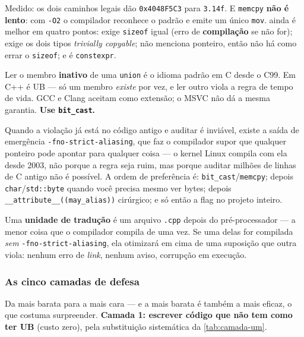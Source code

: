 Medido: os dois caminhos legais dão \texttt{0x4048F5C3} para \texttt{3.14f}. E
\texttt{memcpy} \textbf{não é lento}: com \texttt{-O2} o compilador reconhece o
padrão e emite um único \texttt{mov}.  ainda é melhor em
quatro pontos: exige \texttt{sizeof} igual (erro de \textbf{compilação} se não
for); exige os dois tipos \emph{trivially copyable}; não menciona ponteiro, então
não há como errar o \texttt{sizeof}; e é \texttt{constexpr}.

\begin{armadilha}
Ler o membro \textbf{inativo} de uma \texttt{union} é o idioma padrão em C desde o
C99. Em C++ é UB --- só um membro \emph{existe} por vez, e ler outro viola a regra
de tempo de vida. GCC e Clang aceitam como extensão; o MSVC não dá a mesma
garantia. \textbf{Use \texttt{bit\_cast}.}
\end{armadilha}

Quando a violação já está no código antigo e auditar é inviável, existe a saída de
emergência \texttt{-fno-strict-aliasing}, que faz o compilador supor que qualquer
ponteiro pode apontar para qualquer coisa --- o kernel Linux compila com ela desde
2003, não porque a regra seja ruim, mas porque auditar milhões de linhas de C
antigo não é possível. A ordem de preferência é: \texttt{bit\_cast}/\texttt{memcpy};
depois \texttt{char}/\texttt{std::byte} quando você precisa mesmo ver bytes;
depois \texttt{\_\_attribute\_\_((may\_alias))} cirúrgico; e só então a flag no
projeto inteiro.

\begin{armadilha}
Uma \textbf{unidade de tradução} é um arquivo \texttt{.cpp} depois do
pré-processador --- a menor coisa que o compilador compila de uma vez. Se uma
delas for compilada \emph{sem} \texttt{-fno-strict-aliasing}, ela otimizará em
cima de uma suposição que outra viola: nenhum erro de \emph{link}, nenhum aviso,
corrupção em execução.
\end{armadilha}

\subsubsection{As cinco camadas de defesa}

Da mais barata para a mais cara --- e a mais barata é também a mais eficaz, o que
costuma surpreender. \textbf{Camada 1: escrever código que não tem como ter UB}
(custo zero), pela substituição sistemática da \cref{tab:camada-um}.


